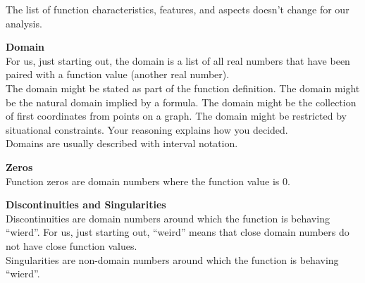 \documentclass{ximera}
\begin{document}
The list of function characteristics, features, and aspects doesn't change for our analysis. \\





\begin{explanation}  \textbf{\textcolor{blue!75!black}{Domain}} \\

For us, just starting out, the domain is a list of all real numbers that have been paired with a function value (another real number). \\


The domain might be stated as part of the function definition. The domain might be the natural domain implied by a formula.  The domain might be the collection of first coordinates from points on a graph.  The domain might be restricted by situational constraints. Your reasoning explains how you decided. \\


Domains are usually described with interval notation.

\end{explanation}











\begin{explanation}  \textbf{\textcolor{blue!75!black}{Zeros}} \\

Function zeros are domain numbers where the function value is $0$.

\end{explanation}












\begin{explanation}  \textbf{\textcolor{blue!75!black}{Discontinuities and Singularities}} \\

Discontinuities are domain numbers around which the function is behaving ``wierd''. For us, just starting out, ``weird'' means that close domain numbers do not have close function values.   \\




Singularities are non-domain numbers around which the function is behaving ``wierd''.   \\


\end{explanation}
\end{document}
